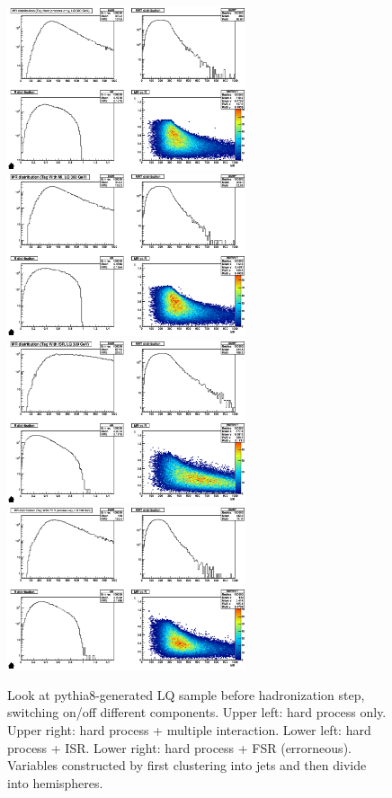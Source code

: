 \documentclass{fheadnote}
\begin{document}
\begin{figure}[htbp]
   \centering
   \includegraphics[width=7cm]{Figures/MRToy11_Nothing_Hemisphere}
   \includegraphics[width=7cm]{Figures/MRToy11_MI_Hemisphere}\\
   \includegraphics[width=7cm]{Figures/MRToy11_ISR_Hemisphere}
   \includegraphics[width=7cm]{Figures/MRToy11_FSR_Hemisphere}
   \caption{Look at pythia8-generated LQ sample before hadronization step, switching on/off different components.  Upper left: hard process only.  Upper right: hard process + multiple interaction.
   Lower left: hard process + ISR.  Lower right: hard process + FSR (errorneous).  Variables constructed by first clustering into jets and then divide into hemispheres.}
   \label{Figure_MRToy11_Hemisphere}
\end{figure}
\end{document}
